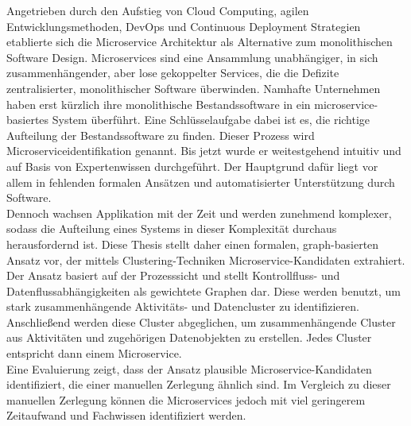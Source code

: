 
\Abstract
Angetrieben durch den Aufstieg von Cloud Computing, agilen Entwicklungsmethoden, DevOps und Continuous Deployment Strategien etablierte sich die Microservice Architektur als Alternative zum monolithischen Software Design. Microservices sind eine Ansammlung unabhängiger, in sich zusammenhängender, aber lose gekoppelter Services, die die Defizite zentralisierter, monolithischer Software überwinden. Namhafte Unternehmen haben erst kürzlich ihre monolithische Bestandssoftware in ein microservice-basiertes System überführt. Eine Schlüsselaufgabe dabei ist es, die richtige Aufteilung der Bestandssoftware zu finden. Dieser Prozess wird Microserviceidentifikation genannt. Bis jetzt wurde er weitestgehend intuitiv und auf Basis von Expertenwissen durchgeführt. Der Hauptgrund dafür liegt vor allem in fehlenden formalen Ansätzen und automatisierter Unterstützung durch Software.\\
Dennoch wachsen Applikation mit der Zeit und werden zunehmend komplexer, sodass die Aufteilung eines Systems in dieser Komplexität durchaus herausfordernd ist. Diese Thesis stellt daher einen formalen, graph-basierten Ansatz vor, der mittels Clustering-Techniken Microservice-Kandidaten extrahiert. Der Ansatz basiert auf der Prozesssicht und stellt Kontrollfluss- und Datenflussabhängigkeiten als gewichtete Graphen dar. Diese werden benutzt, um stark zusammenhängende Aktivitäts- und Datencluster zu identifizieren. Anschließend werden diese Cluster abgeglichen, um zusammenhängende Cluster aus Aktivitäten und zugehörigen Datenobjekten zu erstellen. Jedes Cluster entspricht dann einem Microservice. \\
Eine Evaluierung zeigt, dass der Ansatz plausible Microservice-Kandidaten identifiziert, die einer manuellen Zerlegung ähnlich sind. Im Vergleich zu dieser manuellen Zerlegung können die Microservices jedoch mit viel geringerem Zeitaufwand und Fachwissen identifiziert werden.

